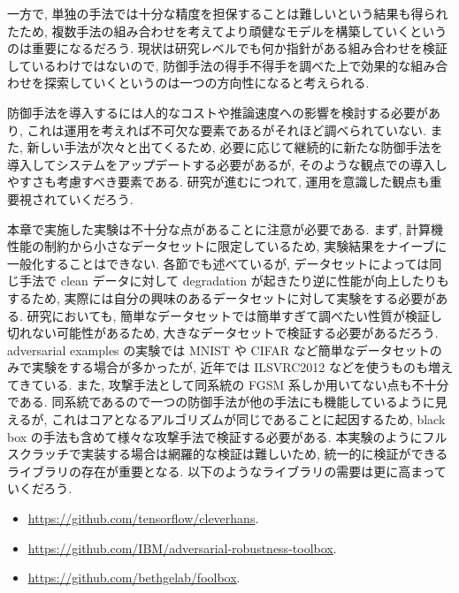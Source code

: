 一方で, 単独の手法では十分な精度を担保することは難しいという結果も得られたため, 複数手法の組み合わせを考えてより頑健なモデルを構築していくというのは重要になるだろう.
現状は研究レベルでも何か指針がある組み合わせを検証しているわけではないので, 防御手法の得手不得手を調べた上で効果的な組み合わせを探索していくというのは一つの方向性になると考えられる.

防御手法を導入するには人的なコストや推論速度への影響を検討する必要があり, これは運用を考えれば不可欠な要素であるがそれほど調べられていない.
また, 新しい手法が次々と出てくるため, 必要に応じて継続的に新たな防御手法を導入してシステムをアップデートする必要があるが, そのような観点での導入しやすさも考慮すべき要素である.
研究が進むにつれて, 運用を意識した観点も重要視されていくだろう.

本章で実施した実験は不十分な点があることに注意が必要である.
まず, 計算機性能の制約から小さなデータセットに限定しているため, 実験結果をナイーブに一般化することはできない.
各節でも述べているが, データセットによっては同じ手法で clean データに対して degradation が起きたり逆に性能が向上したりもするため, 実際には自分の興味のあるデータセットに対して実験をする必要がある.
研究においても, 簡単なデータセットでは簡単すぎて調べたい性質が検証し切れない可能性があるため, 大きなデータセットで検証する必要があるだろう.
adversarial examples の実験では MNIST や CIFAR など簡単なデータセットのみで実験をする場合が多かったが, 近年では ILSVRC2012 などを使うものも増えてきている.
また, 攻撃手法として同系統の FGSM 系しか用いてない点も不十分である.
同系統であるので一つの防御手法が他の手法にも機能しているように見えるが, これはコアとなるアルゴリズムが同じであることに起因するため, black box の手法も含めて様々な攻撃手法で検証する必要がある.
本実験のようにフルスクラッチで実装する場合は網羅的な検証は難しいため, 統一的に検証ができるライブラリの存在が重要となる.
以下のようなライブラリの需要は更に高まっていくだろう.
%
\begin{itemize}
  \item \href{https://github.com/tensorflow/cleverhans}{https://github.com/tensorflow/cleverhans}.
  \item \href{https://github.com/IBM/adversarial-robustness-toolbox}{https://github.com/IBM/adversarial-robustness-toolbox}.
  \item \href{https://github.com/bethgelab/foolbox}{https://github.com/bethgelab/foolbox}.
\end{itemize}
%
